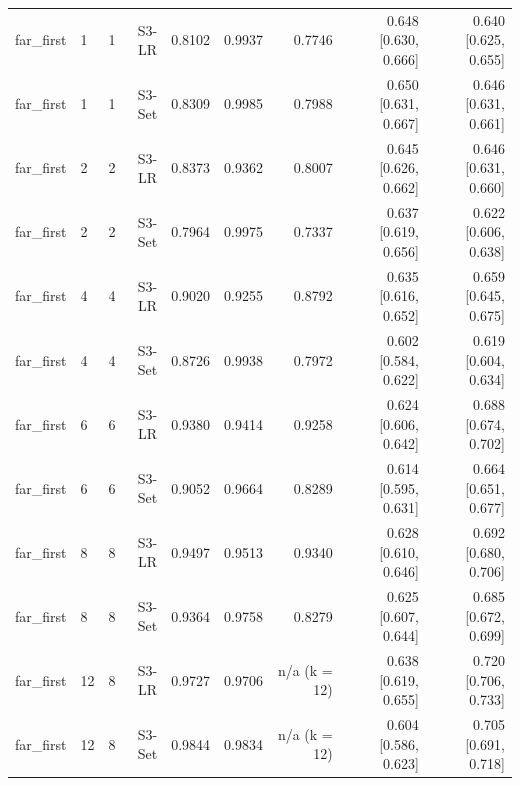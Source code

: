 \begin{table}[htbp]
\begin{tabular}{llrrrrrrr}
far\_first & 1 & 1 & S3-LR & 0.8102 & 0.9937 & 0.7746 & 0.648 [0.630, 0.666] & 0.640 [0.625, 0.655] \\
far\_first & 1 & 1 & S3-Set & 0.8309 & 0.9985 & 0.7988 & 0.650 [0.631, 0.667] & 0.646 [0.631, 0.661] \\
far\_first & 2 & 2 & S3-LR & 0.8373 & 0.9362 & 0.8007 & 0.645 [0.626, 0.662] & 0.646 [0.631, 0.660] \\
far\_first & 2 & 2 & S3-Set & 0.7964 & 0.9975 & 0.7337 & 0.637 [0.619, 0.656] & 0.622 [0.606, 0.638] \\
far\_first & 4 & 4 & S3-LR & 0.9020 & 0.9255 & 0.8792 & 0.635 [0.616, 0.652] & 0.659 [0.645, 0.675] \\
far\_first & 4 & 4 & S3-Set & 0.8726 & 0.9938 & 0.7972 & 0.602 [0.584, 0.622] & 0.619 [0.604, 0.634] \\
far\_first & 6 & 6 & S3-LR & 0.9380 & 0.9414 & 0.9258 & 0.624 [0.606, 0.642] & 0.688 [0.674, 0.702] \\
far\_first & 6 & 6 & S3-Set & 0.9052 & 0.9664 & 0.8289 & 0.614 [0.595, 0.631] & 0.664 [0.651, 0.677] \\
far\_first & 8 & 8 & S3-LR & 0.9497 & 0.9513 & 0.9340 & 0.628 [0.610, 0.646] & 0.692 [0.680, 0.706] \\
far\_first & 8 & 8 & S3-Set & 0.9364 & 0.9758 & 0.8279 & 0.625 [0.607, 0.644] & 0.685 [0.672, 0.699] \\
far\_first & 12 & 8 & S3-LR & 0.9727 & 0.9706 & n/a (k = 12) & 0.638 [0.619, 0.655] & 0.720 [0.706, 0.733] \\
far\_first & 12 & 8 & S3-Set & 0.9844 & 0.9834 & n/a (k = 12) & 0.604 [0.586, 0.623] & 0.705 [0.691, 0.718] \\
\bottomrule
\end{tabular}
\end{table}
